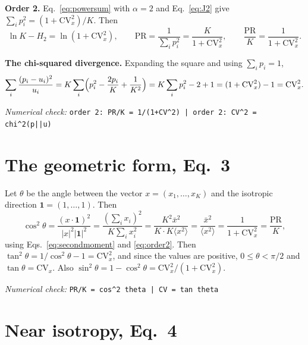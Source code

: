 \documentclass[11pt]{article}
\newcommand{\CV}{\mathrm{CV}}
\newcommand{\PR}{\mathrm{PR}}
\newcommand{\numcheck}[1]{\par{\small\raggedright\noindent\textit{Numerical check:} \texttt{#1}\par}}
\begin{document}
\textbf{Order 2.} Eq.~\eqref{eq:powersum} with $\alpha=2$ and Eq.~\eqref{eq:J2} give
$\sum_ip_i^{2} = (1+\CV_x^2)/K$. Then
\begin{equation}
\ln K - H_2 = \ln(1+\CV_x^2), \qquad \PR = \frac{1}{\sum_ip_i^2} = \frac{K}{1+\CV_x^2},
\qquad \frac{\PR}{K} = \frac{1}{1+\CV_x^2} .
\label{eq:order2}
\end{equation}

\textbf{The chi-squared divergence.} Expanding the square and using $\sum_ip_i=1$,
\begin{equation}
\sum_i\frac{(p_i-u_i)^2}{u_i} = K\sum_i\Bigl(p_i^2 - \frac{2p_i}{K} + \frac{1}{K^2}\Bigr) = K\sum_ip_i^2 - 2 + 1
= (1+\CV_x^2) - 1 = \CV_x^2 .
\end{equation}
\numcheck{order 2: PR/K = 1/(1+CV\^{}2) | order 2: CV\^{}2 = chi\^{}2(p||u)}

\section{The geometric form, Eq.~3}

Let $\theta$ be the angle between the vector $x=(x_1,\ldots,x_K)$ and the isotropic direction $\mathbf 1=(1,\ldots,1)$.
Then
\begin{equation}
\cos^2\theta = \frac{(x\cdot\mathbf 1)^2}{|x|^2|\mathbf 1|^2} = \frac{(\sum_ix_i)^2}{K\sum_ix_i^2}
= \frac{K^2\bar x^2}{K\cdot K\langle x^2\rangle} = \frac{\bar x^2}{\langle x^2\rangle} = \frac{1}{1+\CV_x^2} = \frac{\PR}{K} ,
\end{equation}
using Eqs.~\eqref{eq:secondmoment} and \eqref{eq:order2}. Then $\tan^2\theta = 1/\cos^2\theta - 1 = \CV_x^2$, and
since the values are positive, $0\le\theta<\pi/2$ and $\tan\theta = \CV_x$. Also
$\sin^2\theta = 1-\cos^2\theta = \CV_x^2/(1+\CV_x^2)$.
\numcheck{PR/K = cos\^{}2 theta | CV = tan theta}

\section{Near isotropy, Eq.~4}
\label{sec:near}
\end{document}
